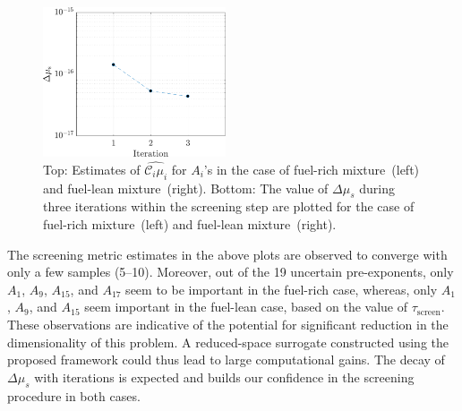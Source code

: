 \begin{figure}[htbp]
\begin{center}
  \includegraphics[width=0.48\textwidth]{./Figures/mu_lean}
\caption{Top: Estimates of $\widehat{\mathcal{C}_i\mu_i}$ for $A_i$'s in the case
of fuel-rich mixture~(left) and fuel-lean mixture~(right). Bottom: The value of
$\Delta\mu_s$ during three iterations within the screening step are plotted for
the case of fuel-rich mixture~(left) and fuel-lean mixture~(right).}
\label{fig:sense_kinetics}
\end{center}
\end{figure}
%
The screening metric estimates in the above plots are observed to converge with
only a few samples (5--10). Moreover, out of the 19 uncertain pre-exponents,
only $A_1$, $A_9$, $A_{15}$, and $A_{17}$ seem to be important in the fuel-rich
case, whereas, only $A_1$, $A_9$, and $A_{15}$ seem important in the fuel-lean
case, based on the value of $\tau_\text{screen}$. These observations are indicative
of the potential for significant reduction in the dimensionality of this problem. 
A reduced-space
surrogate constructed using the proposed framework could thus lead to large computational
gains. The decay of $\Delta\mu_s$ with iterations is expected and builds our confidence
in the screening procedure in both cases.

